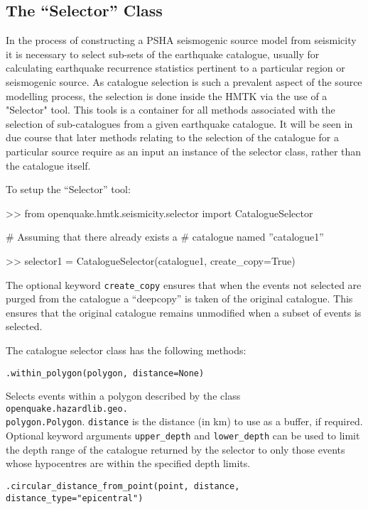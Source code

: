 \subsection{The ``Selector'' Class}

In the process of constructing a PSHA seismogenic source model from seismicity it is necessary to select sub-sets of the earthquake catalogue, usually for calculating earthquake recurrence statistics pertinent to a particular region or seismogenic source. As catalogue selection is such a prevalent aspect of the source modelling process, the selection is done inside the HMTK via the use of a "Selector" tool. This tools is a container for all methods associated with the selection of sub-catalogues from a given earthquake catalogue. It will be seen in due course that later methods relating to the selection of the catalogue for a particular source require as an input an instance of the selector class, rather than the catalogue itself.

To setup the ``Selector'' tool:

\begin{python}[frame=single]
>> from openquake.hmtk.seismicity.selector import CatalogueSelector

# Assuming that there already exists a 
# catalogue named ''catalogue1''

>> selector1 = CatalogueSelector(catalogue1,
                                 create_copy=True)

\end{python}

The optional keyword \verb=create_copy= ensures that when the events not selected are purged from the catalogue a ``deepcopy'' is taken of the original catalogue. This ensures that the original catalogue remains unmodified when a subset of events is selected.

The catalogue selector class has the following methods:

\verb;.within_polygon(polygon, distance=None);

Selects events within a polygon described by the class \verb=openquake.hazardlib.geo.=\\\verb=polygon.Polygon=. \verb=distance= is the distance (in km) to use as a buffer, if required. Optional keyword arguments \verb=upper_depth= and \verb=lower_depth= can be used to limit the depth range of the catalogue returned by the selector to only those events whose hypocentres are within the specified depth limits.

\verb;.circular_distance_from_point(point, distance, distance_type="epicentral");

